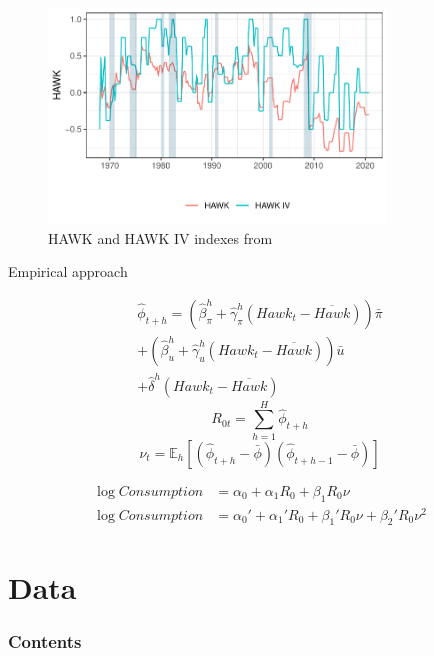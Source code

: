 \documentclass[11pt,pdf,aspectratio=129]{beamer}
\begin{document}
\begin{frame}{}
    \begin{figure}[h!]
        \caption{HAWK and HAWK IV indexes from \citet{HIM2023}}
        \includegraphics[width=0.8\textwidth]{HAWK_plot.pdf}
    \end{figure}
\end{frame}

\begin{frame}{Empirical approach }

    \begin{multline*}\hat \phi_{t+h}=\left(\hat \beta_\pi^h+\hat\gamma^h_\pi \left(\mathit{Hawk}_{t}-\overline{\mathit{Hawk}}\right)\right)\bar\pi\\ +\left(\hat \beta_u^h+\hat\gamma^h_u \left(\mathit{Hawk}_{t}-\overline{\mathit{Hawk}}\right)\right)\bar u\\+\hat\delta^h\left(\mathit{Hawk}_{t}-\overline{\mathit{Hawk}}\right)
    \end{multline*}
    \[R_{0t}=\sum_{h=1}^{H} \hat \phi_{t+h}\]
    \[\nu_t=\mathbb{E}_{h}\left[\left(\hat\phi_{t+h}-\bar \phi\right)\left(\hat \phi_{t+h-1}-\bar \phi\right)\right]\]

    \begin{align}
        \log \mathit{Consumption}&=\alpha_0+\alpha_1 R_0+\beta_1 R_0\nu \label{eq:linear}\\
        \log \mathit{Consumption}&=\alpha_0'+\alpha_1' R_0+\beta_1' R_0\nu + \beta_2' R_0\nu^2\label{eq:quadratic}
    \end{align} 
\end{frame}


\section{Data}
\begin{frame}
    \frametitle{Contents}
    \tableofcontents[currentsection]
\end{frame}
\end{document}

